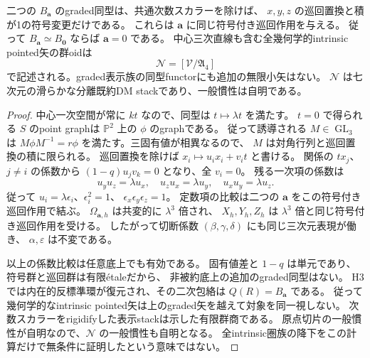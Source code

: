 \begin{proposition}[全包絡矢と三係数の非自明性]
\label{prop:triangle-deform-arrows}
二つの $B_{\boldsymbol a}$ のgraded同型は、共通次数スカラーを除けば、
$x,y,z$ の巡回置換と積が1の符号変更だけである。
これらは $\boldsymbol a$ に同じ符号付き巡回作用を与える。
従って $B_{\boldsymbol a}\simeq B_{\boldsymbol0}$ ならば $\boldsymbol a=0$ である。
中心三次直線も含む全幾何学的intrinsic pointed矢の群oidは
\[
 \mathcal N=[\mathcal V/\mathfrak A_4]
\]
で記述される。graded表示族の同型functorにも追加の無限小矢はない。
$\mathcal N$ は七次元の滑らかな分離既約DM stackであり、一般慣性は自明である。
\end{proposition}
\begin{proof}
中心一次空間が常に $kt$ なので、同型は $t\mapsto\lambda t$ を満たす。
$t=0$ で得られる $S$ のpoint graphは $\mathbb P^2$ 上の $\phi$ のgraphである。
従って誘導される $M\in\operatorname{GL}_3$ は
$M\phi M^{-1}=r\phi$ を満たす。三固有値が相異なるので、
$M$ は対角行列と巡回置換の積に限られる。
巡回置換を除けば $x_i\mapsto u_ix_i+v_it$ と書ける。
関係の $tx_j$、$j\ne i$ の係数から $(1-q)u_jv_k=0$ となり、全 $v_i=0$。
残る一次項の係数は
\[
 u_yu_z=\lambda u_x,\quad u_zu_x=\lambda u_y,\quad
 u_xu_y=\lambda u_z.
\]
従って $u_i=\lambda\epsilon_i$、$\epsilon_i^2=1$、
$\epsilon_x\epsilon_y\epsilon_z=1$。
定数項の比較は二つの $\boldsymbol a$ をこの符号付き巡回作用で結ぶ。
$\Omega_{\boldsymbol a,h}$ は共変的に $\lambda^3$ 倍され、
$X_h,Y_h,Z_h$ は $\lambda^3$ 倍と同じ符号付き巡回作用を受ける。
したがって切断係数 $(\beta,\gamma,\delta)$ にも同じ三次元表現が働き、
$\alpha,\varepsilon$ は不変である。

以上の係数比較は任意底上でも有効である。
固有値差と $1-q$ は単元であり、符号群と巡回群は有限\'{e}taleだから、
非被約底上の追加のgraded同型はない。
H3では内在的反標準環が復元され、その二次包絡は $Q(R)=B_{\boldsymbol a}$ である。
従って幾何学的なintrinsic pointed矢は上のgraded矢を越えて対象を同一視しない。
次数スカラーをrigidifyした表示stackは示した有限群商である。
原点切片の一般慣性が自明なので、$\mathcal N$ の一般慣性も自明となる。
全intrinsic圏族の降下をこの計算だけで無条件に証明したという意味ではない。
\end{proof}

